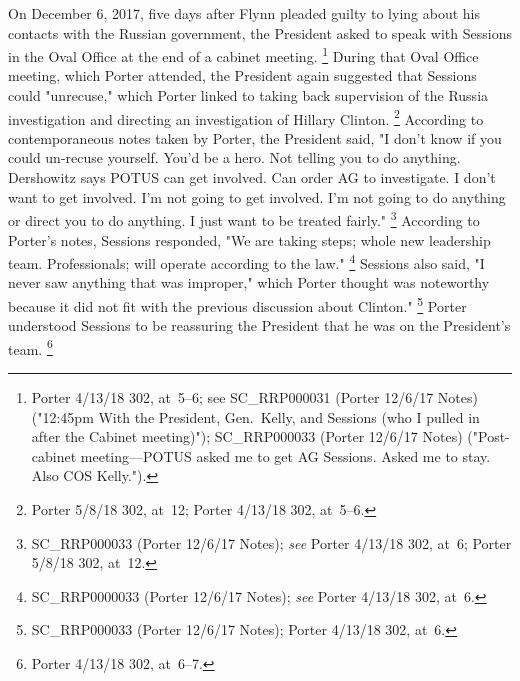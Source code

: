 {On December 6, 2017, five days after Flynn pleaded guilty to lying about his contacts with the Russian government, the President asked to speak with Sessions in the Oval Office at the end of a cabinet meeting.%
\footnote{Porter 4/13/18 302, at~5--6;
see SC\_RRP000031 (Porter 12/6/17 Notes) ("12:45pm With the President, Gen.~Kelly, and Sessions (who I pulled in after the Cabinet meeting)");
SC\_RRP000033 (Porter 12/6/17 Notes) ("Post-cabinet meeting---POTUS asked me to get AG Sessions.
Asked me to stay.
Also COS Kelly.").}
During that Oval Office meeting, which Porter attended, the President again suggested that Sessions could "unrecuse," which Porter linked to taking back supervision of the Russia investigation and directing an investigation of Hillary Clinton.%
\footnote{Porter 5/8/18 302, at~12;
Porter 4/13/18 302, at~5--6.}
According to contemporaneous notes taken by Porter, the President said, "I don't know if you could un-recuse yourself.
You'd be a hero.
Not telling you to do anything.
Dershowitz says POTUS can get involved.
Can order AG to investigate.
I don't want to get involved.
I'm not going to get involved.
I'm not going to do anything or direct you to do anything.
I just want to be treated fairly."%
\footnote{SC\_RRP000033 (Porter 12/6/17 Notes);
\textit{see} Porter 4/13/18 302, at~6;
Porter 5/8/18 302, at~12.}
According to Porter's notes, Sessions responded, "We are taking steps; whole new leadership team.
Professionals; will operate according to the law."%
\footnote{SC\_RRP0000033 (Porter 12/6/17 Notes);
\textit{see} Porter 4/13/18 302, at~6.}
Sessions also said, "I never saw anything that was improper," which Porter thought was noteworthy because it did not fit with the previous discussion about Clinton."%
\footnote{SC\_RRP000033 (Porter 12/6/17 Notes);
Porter 4/13/18 302, at~6.}
Porter understood Sessions to be reassuring the President that he was on the President's team.%
\footnote{Porter 4/13/18 302, at~6--7.}

}
